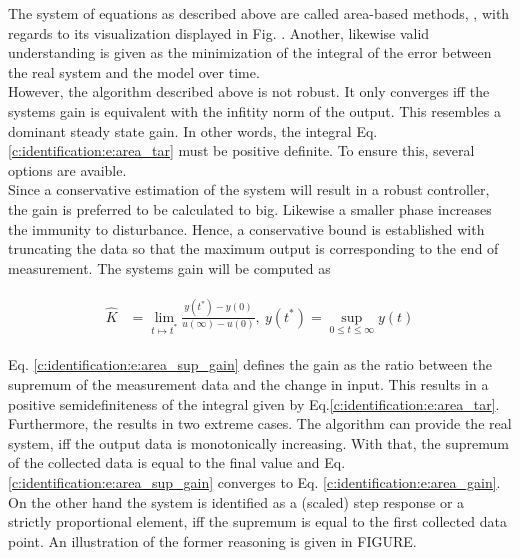 The system of equations as described above are called area-based methods, \cite{Fedele2009a}, with regards to its visualization displayed in Fig. . Another, likewise valid understanding is given as the minimization of the integral of the error between the real system and the model over time.\\

%  

However, the algorithm described above is not robust. It only converges iff the systems gain is equivalent with the infitity norm of the output. This resembles a dominant steady state gain. In other words, the integral Eq. \ref{c:identification:e:area_tar} must be positive definite. To ensure this, several options are avaible. \\

Since a conservative estimation of the system will result in a robust controller, the gain is preferred to be calculated to big. Likewise a smaller phase increases the immunity to disturbance. Hence, a conservative bound is established with truncating the data so that the maximum output is corresponding to the end of measurement. The systems gain will be computed as

\begin{align}
\begin{split}
\hat{K} &= \lim_{t\mapsto t^*} \frac{y(t^*)-y(0)}{u(\infty)-u(0)}, ~ y(t^*) = \sup_{0 \leq t \leq \infty} y(t)
\end{split}
\label{c:identification:e:area_sup_gain}
\end{align}

Eq. \ref{c:identification:e:area_sup_gain} defines the gain as the ratio between the supremum of the measurement data and the change in input. This results in a positive semidefiniteness of the integral given by Eq.\ref{c:identification:e:area_tar}. Furthermore, the results in two extreme cases. The algorithm can provide the real system, iff the output data is monotonically increasing. With that, the supremum of the collected data is equal to the final value and Eq.\ref{c:identification:e:area_sup_gain} converges to Eq. \ref{c:identification:e:area_gain}. On the other hand the system is identified as a (scaled) step response or a strictly proportional element, iff the supremum is equal to the first collected data point. An illustration of the former reasoning is given in FIGURE.\\

